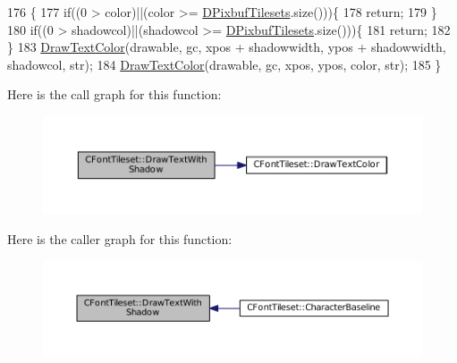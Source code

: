 \begin{DoxyCode}
176                                                                                                            
                                                       \{
177     \textcolor{keywordflow}{if}((0 > color)||(color >= \hyperlink{classCFontTileset_ae6e92dd613809fb15892b51e0e6b4940}{DPixbufTilesets}.size()))\{
178         \textcolor{keywordflow}{return};    
179     \}
180     \textcolor{keywordflow}{if}((0 > shadowcol)||(shadowcol >= \hyperlink{classCFontTileset_ae6e92dd613809fb15892b51e0e6b4940}{DPixbufTilesets}.size()))\{
181         \textcolor{keywordflow}{return};    
182     \}
183     \hyperlink{classCFontTileset_a987f13f64865891b7bf8b10f0b519fb7}{DrawTextColor}(drawable, gc, xpos + shadowwidth, ypos + shadowwidth, shadowcol, str);
184     \hyperlink{classCFontTileset_a987f13f64865891b7bf8b10f0b519fb7}{DrawTextColor}(drawable, gc, xpos, ypos, color, str);
185 \}
\end{DoxyCode}
Here is the call graph for this function\+:
\nopagebreak
\begin{figure}[H]
\begin{center}
\leavevmode
\includegraphics[width=350pt]{classCFontTileset_a6716e51a5692130847914287a5f1b734_cgraph}
\end{center}
\end{figure}
Here is the caller graph for this function\+:
\nopagebreak
\begin{figure}[H]
\begin{center}
\leavevmode
\includegraphics[width=350pt]{classCFontTileset_a6716e51a5692130847914287a5f1b734_icgraph}
\end{center}
\end{figure}
\hypertarget{classCFontTileset_a9564525bf20b3b5b6941e5f86827eb5d}{}\label{classCFontTileset_a9564525bf20b3b5b6941e5f86827eb5d} 
